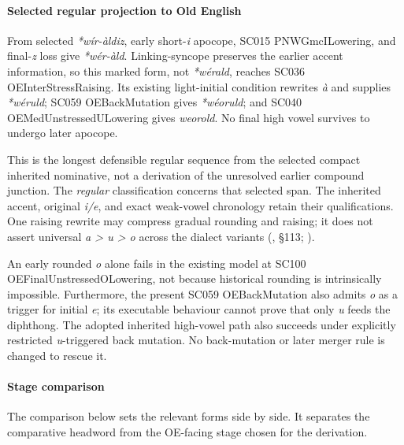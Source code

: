 \documentclass[
  british,
  a4paper,
]{article}
\begin{document}
\paragraph{Selected regular projection to Old
English}\label{selected-regular-projection-to-old-english}

From selected \emph{*wír-àldiz}, early short-\emph{i} apocope, SC015
PNWGmcILowering, and final-\emph{z} loss give \emph{*wér-àld}.
Linking-syncope preserves the earlier accent information, so this marked
form, not \emph{*wérald}, reaches SC036 OEInterStressRaising. Its
existing light-initial condition rewrites \emph{à} and supplies
\emph{*wéruld}; SC059 OEBackMutation gives \emph{*wéoruld}; and SC040
OEMedUnstressedULowering gives \emph{weorold}. No final high vowel
survives to undergo later apocope.

This is the longest defensible regular sequence from the selected
compact inherited nominative, not a derivation of the unresolved earlier
compound junction. The \emph{regular} classification concerns that
selected span. The inherited accent, original \emph{i/e}, and exact
weak-vowel chronology retain their qualifications. One raising rewrite
may compress gradual rounding and raising; it does not assert universal
\emph{a > u > o} across the dialect variants
(, §113;
).

An early rounded \emph{o} alone fails in the existing model at SC100
OEFinalUnstressedOLowering, not because historical rounding is
intrinsically impossible. Furthermore, the present SC059 OEBackMutation
also admits \emph{o} as a trigger for initial \emph{e}; its executable
behaviour cannot prove that only \emph{u} feeds the diphthong. The
adopted inherited high-vowel path also succeeds under explicitly
restricted \emph{u}-triggered back mutation. No back-mutation or later
merger rule is changed to rescue it.

\paragraph{Stage comparison}\label{stage-comparison}

The comparison below sets the relevant forms side by side. It separates
the comparative headword from the OE-facing stage chosen for the
derivation.
\end{document}
